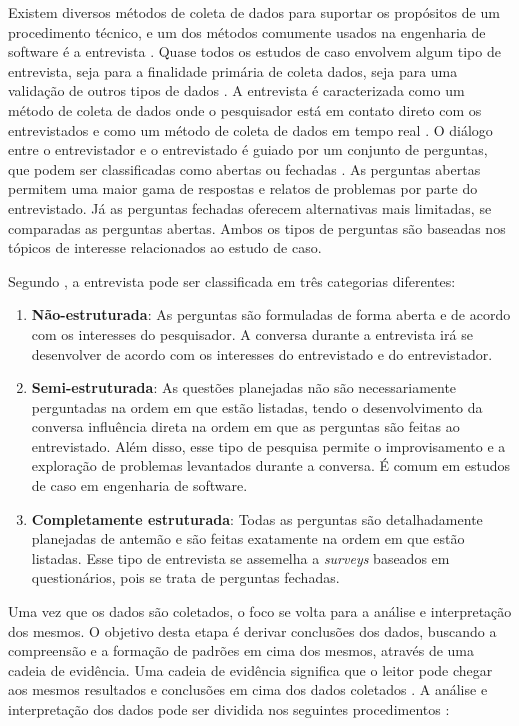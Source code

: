 Existem diversos métodos de coleta de dados para suportar os propósitos de um procedimento técnico, e um dos métodos comumente usados na engenharia de software é a entrevista \cite{caseStudySE}. Quase todos os estudos de caso envolvem algum tipo de entrevista, seja para a finalidade primária de coleta dados, seja para uma validação de outros tipos de dados \cite{caseStudySE}. A entrevista é caracterizada como um método de coleta de dados onde o pesquisador está em contato direto com os entrevistados e como um método de coleta de dados em tempo real \cite{caseStudySE}. O diálogo entre o entrevistador e o entrevistado é guiado por um conjunto de perguntas, que podem ser classificadas como abertas ou fechadas \cite{caseStudySE}. As perguntas abertas permitem uma maior gama de respostas e relatos de problemas por parte do entrevistado. Já as perguntas fechadas oferecem alternativas mais limitadas, se comparadas as perguntas abertas. Ambos os tipos de perguntas são baseadas nos tópicos de interesse relacionados ao estudo de caso.

Segundo , a entrevista pode ser classificada em três categorias diferentes:
\begin{enumerate}
	\item \textbf{Não-estruturada}: As perguntas são formuladas de forma aberta e de acordo com os interesses do pesquisador. A conversa durante a entrevista irá se desenvolver de acordo com os interesses do entrevistado e do entrevistador.
	\item \textbf{Semi-estruturada}: As questões planejadas não são necessariamente perguntadas na ordem em que estão listadas, tendo o desenvolvimento da conversa influência direta na ordem em que as perguntas são feitas ao entrevistado. Além disso, esse tipo de pesquisa permite o improvisamento e a exploração de problemas levantados durante a conversa. É comum em estudos de caso em engenharia de software.
	\item \textbf{Completamente estruturada}: Todas as perguntas são detalhadamente planejadas de antemão e são feitas exatamente na ordem em que estão listadas. Esse tipo de entrevista se assemelha a \textit{surveys} baseados em questionários, pois se trata de perguntas fechadas.
\end{enumerate}

Uma vez que os dados são coletados, o foco se volta para a análise e interpretação dos mesmos. O objetivo desta etapa é derivar conclusões dos dados, buscando a compreensão e a formação de padrões em cima dos mesmos, através de uma cadeia de evidência. Uma cadeia de evidência significa que o leitor pode chegar aos mesmos resultados e conclusões em cima dos dados coletados \cite{caseStudySE}. A análise e interpretação dos dados pode ser dividida nos seguintes procedimentos \cite{caseStudySE}:

